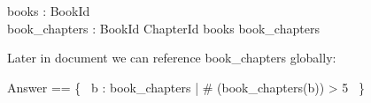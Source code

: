 \documentclass[a4paper,10pt,fleqn]{article}
\begin{document}
\begin{zed}
\end{zed}

\begin{axdef}
books : \finset BookId \\
book\_chapters : BookId \pfun \finset ChapterId
\where
books \subseteq \dom book\_chapters
\end{axdef}

\noindent Later in document we can reference book\_chapters globally:

\bigskip

\begin{zed}
Answer == \{~ b : \dom book\_chapters | \# (book\_chapters(b)) > 5 ~\}
\end{zed}
\end{document}
